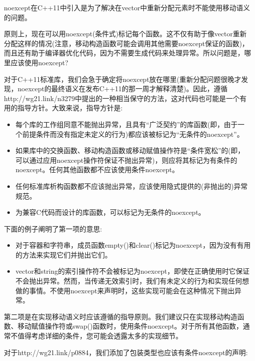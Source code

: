 noexcept在C++11中引入是为了解决在vector中重新分配元素时不能使用移动语义的问题。\par

原则上，现在可以用noexcept(条件式)标记每个函数。这不仅有助于像vector重新分配这样的情况(注意，移动构造函数可能会调用其他需要noexcept保证的函数)，而且还有助于编译器优化代码，因为不需要生成代码来处理异常。所以问题是，哪里应该使用noexcept?\par

对于C++11标准库，我们会急于确定将noexcept放在哪里(重新分配问题很晚才发现，noexcept的最终语义在发布C++11的那一周才解释清楚)。因此，遵循http://wg21.link/n3279中提出的一种相当保守的方法，这对代码也可能是一个有用的指导方针。大致来说，指导方针是:\par

\begin{itemize}
	\item 每个库的工作组同意不能抛出异常，且具有“广泛契约”的库函数(即，由于一个前提条件而没有指定未定义的行为)都应该被标记为“无条件的noexcept”。
	\item 如果库中的交换函数、移动构造函数或移动赋值操作符是“条件宽松”的(即，可以通过应用noexcept操作符保证不抛出异常)，则应将其标记为有条件的noexcept。任何其他函数都不应该使用条件noexcept。
	\item 任何标准库析构函数都不应该抛出异常，应该使用隐式提供的(非抛出的)异常规范。
	\item 为兼容C代码而设计的库函数，可以标记为无条件的noexcept。
\end{itemize}

下面的例子阐明了第一项的意思:\par

\begin{itemize}
	\item 对于容器和字符串，成员函数empty()和clear()标记为noexcept，因为没有有用的方法来实现它们并抛出它们。
	\item vector和string的索引操作符不会被标记为noexcept，即使在正确使用时它保证不会抛出异常。然而，当传递无效索引时，我们有未定义的行为和实现任何想做的事情。不使用noexcept来声明时，这些实现可能会在这种情况下抛出异常。
\end{itemize}

第二项是在实现移动语义时应该遵循的指导原则。我们建议只在实现移动构造函数、移动赋值操作符或swap()函数时，使用条件noexcept。对于所有其他函数，通常不值得考虑详细的条件，您可能会透露太多的实现细节。\par

对于http://wg21.link/p0884，我们添加了包装类型也应该有条件noexcept的声明:\par

